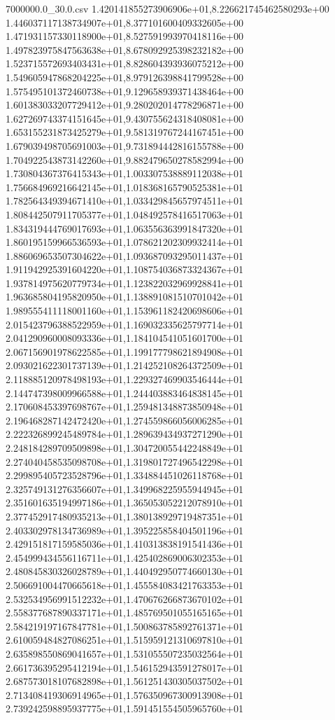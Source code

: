 \begin{filecontents*}{7000000.0_30.0.csv}
1.420141855273906906e+01,8.226621745462580293e+00
1.446037117138734907e+01,8.377101600409332605e+00
1.471931157330118900e+01,8.527591993970418116e+00
1.497823975847563638e+01,8.678092925398232182e+00
1.523715572693403431e+01,8.828604393936075212e+00
1.549605947868204225e+01,8.979126398841799528e+00
1.575495101372460738e+01,9.129658939371438464e+00
1.601383033207729412e+01,9.280202014778296871e+00
1.627269743374151645e+01,9.430755624318408081e+00
1.653155231873425279e+01,9.581319767244167451e+00
1.679039498705691003e+01,9.731894442816155788e+00
1.704922543873142260e+01,9.882479650278582994e+00
1.730804367376415343e+01,1.003307538889112038e+01
1.756684969216642145e+01,1.018368165790525381e+01
1.782564349394671410e+01,1.033429845657974511e+01
1.808442507911705377e+01,1.048492578416517063e+01
1.834319444769017693e+01,1.063556363991847320e+01
1.860195159966536593e+01,1.078621202309932414e+01
1.886069653507304622e+01,1.093687093295011437e+01
1.911942925391604220e+01,1.108754036873324367e+01
1.937814975620779734e+01,1.123822032969928841e+01
1.963685804195820950e+01,1.138891081510701042e+01
1.989555411118001160e+01,1.153961182420698606e+01
2.015423796388522959e+01,1.169032335625797714e+01
2.041290960008093336e+01,1.184104541051601700e+01
2.067156901978622585e+01,1.199177798621894908e+01
2.093021622301737139e+01,1.214252108264372509e+01
2.118885120978498193e+01,1.229327469903546444e+01
2.144747398009966588e+01,1.244403883464838145e+01
2.170608453397698767e+01,1.259481348873850948e+01
2.196468287142472420e+01,1.274559866056006285e+01
2.222326899245489784e+01,1.289639434937271290e+01
2.248184289709509898e+01,1.304720055442248849e+01
2.274040458535098708e+01,1.319801727496542298e+01
2.299895405723528796e+01,1.334884451026118768e+01
2.325749131276356607e+01,1.349968225955944945e+01
2.351601635194997186e+01,1.365053052212078910e+01
2.377452917480935213e+01,1.380138929719487351e+01
2.403302978134736989e+01,1.395225858404501196e+01
2.429151817159585036e+01,1.410313838191541436e+01
2.454999434556116711e+01,1.425402869006302353e+01
2.480845830326028789e+01,1.440492950774660130e+01
2.506691004470665618e+01,1.455584083421763353e+01
2.532534956991512232e+01,1.470676266873670102e+01
2.558377687890337171e+01,1.485769501055165165e+01
2.584219197167847781e+01,1.500863785892761371e+01
2.610059484827086251e+01,1.515959121310697810e+01
2.635898550869041657e+01,1.531055507235032564e+01
2.661736395295412194e+01,1.546152943591278017e+01
2.687573018107682898e+01,1.561251430305037502e+01
2.713408419306914965e+01,1.576350967300913908e+01
2.739242598895937775e+01,1.591451554505965760e+01

\end{filecontents*}
